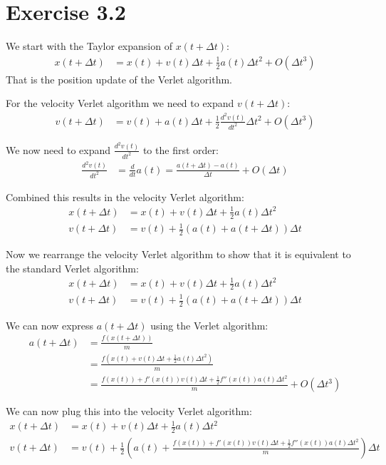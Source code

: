 \documentclass[a4paper,11pt,bibtotoc]{scrartcl}
\begin{document}
\section{Exercise 3.2}

We start with the Taylor expansion of $x(t + \Delta t)$:
\begin{align}
	x(t + \Delta t) &= x(t) + v(t) \Delta t + \frac{1}{2} a(t) \Delta t^2 + O(\Delta t^3)
\end{align}
That is the position update of the Verlet algorithm.

For the velocity Verlet algorithm we need to expand $v(t + \Delta t)$:
\begin{align}
	v(t + \Delta t) &= v(t) + a(t) \Delta t + \frac{1}{2} \frac{d^2 v(t)}{dt^2} \Delta t^2 + O(\Delta t^3)
\end{align}

We now need to expand $\frac{d^2 v(t)}{dt^2}$ to the first order:
\begin{align}
	\frac{d^2 v(t)}{dt^2} &= \frac{d}{dt} a(t) = \frac{a(t + \Delta t) - a(t)}{\Delta t} + O(\Delta t)
\end{align}

Combined this results in the velocity Verlet algorithm:
\begin{align}
	x(t + \Delta t) &= x(t) + v(t) \Delta t + \frac{1}{2} a(t) \Delta t^2 \\
	v(t + \Delta t) &= v(t) + \frac{1}{2} (a(t) + a(t + \Delta t)) \Delta t 
\end{align}	

Now we rearrange the velocity Verlet algorithm to show that it is equivalent to the standard Verlet algorithm:
\begin{align}
	x(t + \Delta t) &= x(t) + v(t) \Delta t + \frac{1}{2} a(t) \Delta t^2 \\
	v(t + \Delta t) &= v(t) + \frac{1}{2} (a(t) + a(t + \Delta t)) \Delta t
\end{align}

We can now express $a(t + \Delta t)$ using the Verlet algorithm:
\begin{align}
	a(t + \Delta t) &= \frac{f(x(t + \Delta t))}{m} \\
	&= \frac{f(x(t) + v(t) \Delta t + \frac{1}{2} a(t) \Delta t^2)}{m} \\
	&= \frac{f(x(t)) + f'(x(t)) v(t) \Delta t + \frac{1}{2} f''(x(t)) a(t) \Delta t^2}{m} + O(\Delta t^3)
\end{align}

We can now plug this into the velocity Verlet algorithm:
\begin{align}
	x(t + \Delta t) &= x(t) + v(t) \Delta t + \frac{1}{2} a(t) \Delta t^2 \\
	v(t + \Delta t) &= v(t) + \frac{1}{2} (a(t) + \frac{f(x(t)) + f'(x(t)) v(t) \Delta t + \frac{1}{2} f''(x(t)) a(t) \Delta t^2}{m}) \Delta t
\end{align}
\end{document}
